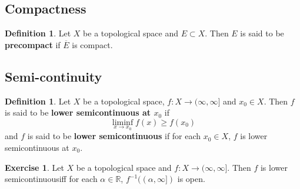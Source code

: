\documentclass[12pt]{amsart}
\theoremstyle{definition}
\newtheorem{defn}[definition]{Definition}
\newtheorem{ex}[definition]{Exercise}
\newcommand{\al}{\alpha}
\newcommand{\R}{\mathbb{R}}
\newcommand{\Ru}{(\infty, \infty]}
\newcommand{\lsc}{lower semicontinuous}
\newcommand{\lex}[1]{\label{ex:#1}}
\newcommand{\ld}[1]{\label{defn:#1}}
\begin{document}
	
	
	
	
	
	
	
	
	
	
	
	
	
	
	\newpage
	\subsection{Compactness}
	
	\begin{defn} \ld{}
		Let $X$ be a topological space and $E \subset X$. Then $E$ is said to be \textbf{precompact} if $\overline{E}$ is compact.
	\end{defn}







	
	
	
	
	
	
	
	
	
	
	
	
	
	
	
	
	
	
	\newpage
	\subsection{Semi-continuity}
	
	\begin{defn} \ld{}
	Let $X$ be a topological space, $f: X \rightarrow \Ru$ and $x_0 \in X$. Then $f$ is said to be \textbf{lower semicontinuous at $x_0$} if $$\liminf_{x \rightarrow x_0}f(x) \geq f(x_0)$$ and $f$ is said to be \textbf{lower semicontinuous} if for each $x_0 \in X$, $f$ is lower semicontinuous at $x_0$. 
	\end{defn}
	
	\begin{ex} \lex{}
	Let $X$ be a topological space and $f: X \rightarrow \Ru$. Then $f$ is \lsc iff for each $\al \in \R$, $f^{-1}((\al, \infty])$ is open. 
	\end{ex}
	
\end{document}
